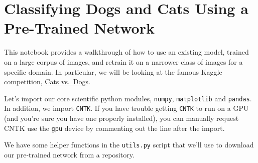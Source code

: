 \documentclass[]{book}
\newenvironment{Shaded}{\begin{snugshade}}{\end{snugshade}}
\newcommand{\DecValTok}[1]{\textcolor[rgb]{0.00,0.00,0.81}{#1}}
\newcommand{\StringTok}[1]{\textcolor[rgb]{0.31,0.60,0.02}{#1}}
\newcommand{\ImportTok}[1]{#1}
\newcommand{\CommentTok}[1]{\textcolor[rgb]{0.56,0.35,0.01}{\textit{#1}}}
\newcommand{\OperatorTok}[1]{\textcolor[rgb]{0.81,0.36,0.00}{\textbf{#1}}}
\newcommand{\BuiltInTok}[1]{#1}
\newcommand{\NormalTok}[1]{#1}
\theoremstyle{definition}
\theoremstyle{definition}
\theoremstyle{definition}
\theoremstyle{remark}
\begin{document}
\section{Classifying Dogs and Cats Using a Pre-Trained
Network}\label{classifying-dogs-and-cats-using-a-pre-trained-network}

This notebook provides a walkthrough of how to use an existing model,
trained on a large corpus of images, and retrain it on a narrower class
of images for a specific domain. In particular, we will be looking at
the famous Kaggle competition,
\href{https://www.kaggle.com/c/dogs-vs-cats-redux-kernels-edition}{Cats
vs.~Dogs}.

Let's import our core scientific python modules, \texttt{numpy},
\texttt{matplotlib} and \texttt{pandas}. In addition, we import
\texttt{CNTK}. If you have trouble getting \texttt{CNTK} to run on a GPU
(and you're sure you have one properly installed), you can manually
request CNTK use the \texttt{gpu} device by commenting out the line
after the import.

We have some helper functions in the \texttt{utils.py} script that we'll
use to download our pre-trained network from a repository.

\begin{Shaded}
\end{Shaded}
\end{document}
